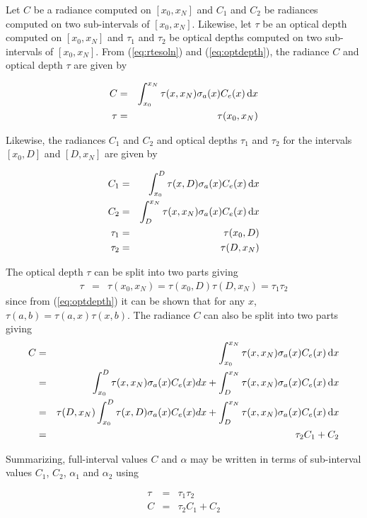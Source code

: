 {Let $C$ be a radiance computed on $[x_0,x_N]$ and $C_1$ and $C_2$
be radiances computed on two sub-intervals of $[x_0,x_N]$.
Likewise, let $\tau$ be an optical depth computed on $[x_0,x_N]$
and $\tau_1$ and $\tau_2$ be optical depths computed on two
sub-intervals of $[x_0,x_N]$. From (\ref{eq:rtesoln}) and
(\ref{eq:optdepth}), the radiance $C$ and optical depth $\tau$ are
given by

\begin{eqnarray}
C&=&\int_{x_0}^{x_N}\tau(x,x_N)\sigma_a(x)C_e(x)\,\mbox{d}x\\
\tau&=&\tau(x_0,x_N)
\end{eqnarray}

Likewise, the radiances $C_1$ and $C_2$ and optical depths
$\tau_1$ and $\tau_2$ for the intervals $[x_0,D]$ and $[D,x_N]$
are given by

\begin{eqnarray}
C_1&=&\int_{x_0}^{D}\tau(x,D)\sigma_a(x)C_e(x)\,\mbox{d}x\\
C_2&=&\int_{D}^{x_N}\tau(x,x_N)\sigma_a(x)C_e(x)\,\mbox{d}x\\
\tau_1&=&\tau(x_0,D)\\
\tau_2&=&\tau(D,x_N)
\end{eqnarray}

The optical depth $\tau$ can be split into two parts giving
\begin{eqnarray}
\tau&=&\tau(x_0,x_N)=\tau(x_0,D)\tau(D,x_N)=\tau_1\tau_2
\end{eqnarray}
since from (\ref{eq:optdepth}) it can be shown that for any $x$, $\tau(a,b)=\tau(a,x)\tau(x,b)$.
The radiance $C$ can also be split into two parts giving
\begin{eqnarray}
C&=&\int_{x_0}^{x_N}\tau(x,x_N)\sigma_a(x)C_e(x)\,\mbox{d}x\\
&=&\int_{x_0}^{D}\tau(x,x_N)\sigma_a(x)C_e(x)dx+\int_{D}^{x_N}\tau(x,x_N)\sigma_a(x)C_e(x)\,\mbox{d}x\\
&=&\tau(D,x_N)\int_{x_0}^{D}\tau(x,D)\sigma_a(x)C_e(x)dx+\int_{D}^{x_N}\tau(x,x_N)\sigma_a(x)C_e(x)\,\mbox{d}x\\
&=&\tau_2C_1+C_2
\end{eqnarray}

Summarizing, full-interval values $C$ and $\alpha$ may be written
in terms of sub-interval values $C_1$, $C_2$, $\alpha_1$ and
$\alpha_2$ using

\begin{eqnarray}
\label{eq:alpha_summary}
\tau&=&\tau_1\tau_2\\
\label{eq:C_summary}
C&=&\tau_2C_1+C_2
\end{eqnarray}

}
